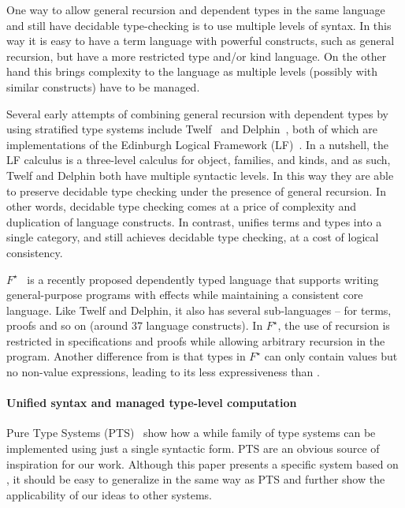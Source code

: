 One way to allow general recursion and dependent types in the same
language and still have decidable type-checking is to use multiple
levels of syntax. In this way it is easy to have a term language with
powerful constructs, such as general recursion, but have a more
restricted type and/or kind language. On the other hand this brings
complexity to the language as multiple levels (possibly with similar
constructs) have to be managed.

Several early attempts of combining general recursion with dependent
types by using stratified type systems include Twelf~\cite{lf:twelf}
and Delphin~\cite{lf:delphin}, both of which are implementations of
the Edinburgh Logical Framework (LF)~\cite{harper:lf}. In a nutshell,
the LF calculus is a three-level calculus for object, families, and
kinds, and as such, Twelf and Delphin both have multiple syntactic
levels. In this way they are able to preserve decidable type checking
under the presence of general recursion. In other words, decidable
type checking comes at a price of complexity and duplication of
language constructs. In contrast, \name unifies terms and types into a
single category, and still achieves decidable type checking, at a cost
of logical consistency.

$F^{\star}$~\cite{Swamy2011} is a recently proposed dependently typed
language that supports writing general-purpose programs with effects
while maintaining a consistent core language. Like Twelf and Delphin,
it also has several sub-languages -- for terms, proofs and so on
(around 37 language constructs). In $F^{\star}$, the use of recursion
is restricted in specifications and proofs while allowing arbitrary
recursion in the program. Another difference from \name is that types
in $F^{\star}$ can only contain values but no non-value expressions,
leading to its less expressiveness than \name.

\paragraph{Unified syntax and managed type-level computation}

Pure Type Systems (PTS)~\cite{pts} show how a while family of type
systems can be implemented using just a single syntactic form. PTS are
an obvious source of inspiration for our work. Although this paper
presents a specific system based on \coc, it should be easy to
generalize \name in the same way as PTS and further show the
applicability of our ideas to other systems.

